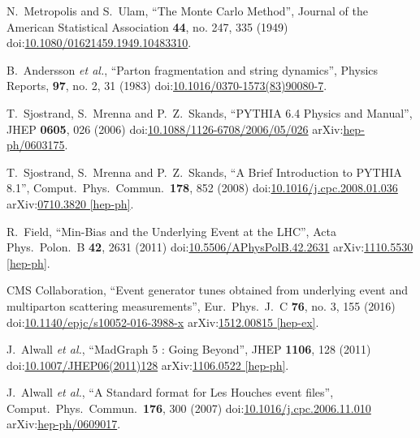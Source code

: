 \begin{thebibliography}{99}


N.~Metropolis and S.~Ulam, ``The Monte Carlo Method'', Journal of the American Statistical Association {\bf 44}, no. 247, 335 (1949) doi:\href{http://dx.doi.org/10.2307/2280232}{10.1080/01621459.1949.10483310}.

B.~Andersson {\it et al.}, ``Parton fragmentation and string dynamics'', Physics Reports, {\bf 97}, no. 2, 31 (1983) doi:\href{http://www.sciencedirect.com/science/article/pii/0370157383900807}{10.1016/0370-1573(83)90080-7}.

T.~Sjostrand, S.~Mrenna and P.~Z.~Skands, ``PYTHIA 6.4 Physics and Manual'', JHEP {\bf 0605}, 026 (2006) doi:\href{http://dx.doi.org/10.1088/1126-6708/2006/05/026}{10.1088/1126-6708/2006/05/026} arXiv:\href{https://arxiv.org/abs/hep-ph/0603175}{hep-ph/0603175}.

T.~Sjostrand, S.~Mrenna and P.~Z.~Skands, ``A Brief Introduction to PYTHIA 8.1'', Comput.\ Phys.\ Commun.\ {\bf 178}, 852 (2008) doi:\href{http://dx.doi.org/10.1016/j.cpc.2008.01.036}{10.1016/j.cpc.2008.01.036} arXiv:\href{https://arxiv.org/abs/0710.3820L}{0710.3820 [hep-ph]}.

R.~Field, ``Min-Bias and the Underlying Event at the LHC'', Acta Phys.\ Polon.\ B {\bf 42}, 2631 (2011) doi:\href{http://dx.doi.org/10.5506/APhysPolB.42.2631}{10.5506/APhysPolB.42.2631} arXiv:\href{https://arxiv.org/abs/1110.5530}{1110.5530 [hep-ph]}. 

CMS Collaboration, ``Event generator tunes obtained from underlying event and multiparton scattering measurements'', Eur.\ Phys.\ J.\ C {\bf 76}, no. 3, 155 (2016) doi:\href{http://dx.doi.org/10.1140/epjc/s10052-016-3988-x}{10.1140/epjc/s10052-016-3988-x} arXiv:\href{https://arxiv.org/abs/1512.00815}{1512.00815 [hep-ex]}.

J.~Alwall {\it et al.}, ``MadGraph 5 : Going Beyond'', JHEP {\bf 1106}, 128 (2011) doi:\href{https://doi.org/10.1007/JHEP06(2011)128}{10.1007/JHEP06(2011)128} arXiv:\href{https://arxiv.org/abs/1106.0522}{1106.0522 [hep-ph]}.

J.~Alwall {\it et al.}, ``A Standard format for Les Houches event files'', Comput.\ Phys.\ Commun.\ {\bf 176}, 300 (2007) doi:\href{http://dx.doi.org/10.1016/j.cpc.2006.11.010}{10.1016/j.cpc.2006.11.010} arXiv:\href{https://arxiv.org/abs/hep-ph/0609017}{hep-ph/0609017}.
 

\end{thebibliography}
